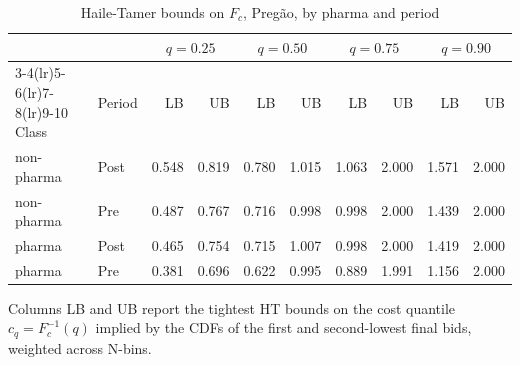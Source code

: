 \begin{table}[htbp]
\centering
\begin{threeparttable}
\caption{Haile-Tamer bounds on $F_c$, Preg\~ao, by pharma and period}
\label{tab:v3_pregao_ht_refined}
\small
\begin{tabular}{llrrrrrrrr}
\toprule
 & & \multicolumn{2}{c}{$q{=}0.25$} & \multicolumn{2}{c}{$q{=}0.50$} & \multicolumn{2}{c}{$q{=}0.75$} & \multicolumn{2}{c}{$q{=}0.90$} \\
\cmidrule(lr){3-4}\cmidrule(lr){5-6}\cmidrule(lr){7-8}\cmidrule(lr){9-10}
Class & Period & LB & UB & LB & UB & LB & UB & LB & UB \\
\midrule
non-pharma & Post & 0.548 & 0.819 & 0.780 & 1.015 & 1.063 & 2.000 & 1.571 & 2.000 \\
non-pharma & Pre & 0.487 & 0.767 & 0.716 & 0.998 & 0.998 & 2.000 & 1.439 & 2.000 \\
pharma & Post & 0.465 & 0.754 & 0.715 & 1.007 & 0.998 & 2.000 & 1.419 & 2.000 \\
pharma & Pre & 0.381 & 0.696 & 0.622 & 0.995 & 0.889 & 1.991 & 1.156 & 2.000 \\
\bottomrule
\end{tabular}
\begin{tablenotes}\footnotesize
\item Columns LB and UB report the tightest HT bounds on the
cost quantile $c_q = F_c^{-1}(q)$ implied by the CDFs of the
first and second-lowest final bids, weighted across N-bins.
\end{tablenotes}
\end{threeparttable}
\end{table}
